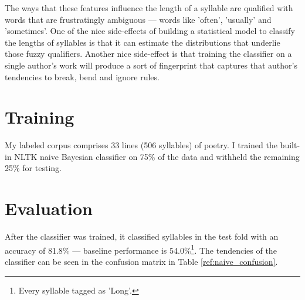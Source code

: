 \documentclass[12pt]{article}
\begin{document}
The ways that these features influence the length of a syllable are qualified with words that are frustratingly ambiguous --- words like 'often', 'usually' and 'sometimes'. One of the nice side-effects of building a statistical model to classify the lengths of syllables is that it can estimate the distributions that underlie those fuzzy qualifiers. Another nice side-effect is that training the classifier on a single author's work will produce a sort of fingerprint that captures that author's tendencies to break, bend and ignore rules. 

\section*{Training}
My labeled corpus comprises 33 lines (506 syllables) of poetry. I trained the built-in NLTK naive Bayesian classifier on 75\% of the data and withheld the remaining 25\% for testing.

\section*{Evaluation}
After the classifier was trained, it classified syllables in the test fold with an accuracy of 81.8\% --- baseline performance is 54.0\%\footnote{Every syllable tagged as 'Long'.}. The tendencies of the classifier can be seen in the confusion matrix in Table \ref{ref:naive_confusion}.
\end{document}
